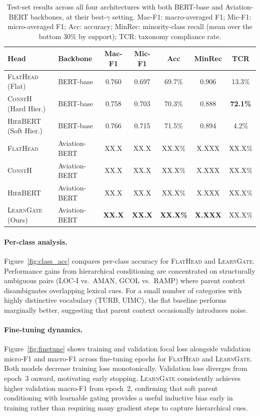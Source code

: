 \documentclass{article}
\newcommand{\modA}{\textsc{FlatHead}}
\newcommand{\modB}{\textsc{ConstH}}
\newcommand{\modC}{\textsc{HierBERT}}
\newcommand{\modD}{\textsc{LearnGate}}
\begin{document}
\begin{table}[h]
\centering
\caption{Test-set results across all four architectures with both
BERT-base and Aviation-BERT backbones, at their best-$\gamma$ setting.
Mac-F1: macro-averaged F1; Mic-F1: micro-averaged F1; Acc: accuracy;
MinRec: minority-class recall (mean over the bottom 30\% by support);
TCR: taxonomy compliance rate.}
\smallskip
\begin{tabular}{llccccc}
\toprule
Head & Backbone & Mac-F1 & Mic-F1 & Acc & MinRec & TCR \\
\midrule
\modA{} (Flat)       & BERT-base       & 0.760 & 0.697 & 69.7\% & 0.906 & 13.3\% \\
\modB{} (Hard Hier.) & BERT-base       & 0.758 & 0.703 & 70.3\% & 0.888 & \textbf{72.1\%} \\
\modC{} (Soft Hier.) & BERT-base       & 0.766 & 0.715 & 71.5\% & 0.894 & 4.2\% \\
\modA{}              & Aviation-BERT   & XX.X  & XX.X  & XX.X\% & X.XXX & XX.X\% \\
\modB{}              & Aviation-BERT   & XX.X  & XX.X  & XX.X\% & X.XXX & XX.X\% \\
\modC{}              & Aviation-BERT   & XX.X  & XX.X  & XX.X\% & X.XXX & XX.X\% \\
\modD{} (Ours)       & Aviation-BERT   & \textbf{XX.X} & \textbf{XX.X} & \textbf{XX.X\%} & \textbf{X.XXX} & XX.X\% \\
\bottomrule
\end{tabular}
\label{tab:results}
\end{table}

\paragraph{Per-class analysis.}
Figure~\ref{fig:class_acc} compares per-class accuracy for \modA{} and
\modD.
Performance gains from hierarchical conditioning are concentrated on
structurally ambiguous pairs (LOC-I vs.~AMAN, GCOL vs.~RAMP) where
parent context disambiguates overlapping lexical cues.
For a small number of categories with highly distinctive vocabulary
(TURB, UIMC), the flat baseline performs marginally better, suggesting
that parent context occasionally introduces noise.

\paragraph{Fine-tuning dynamics.}
Figure~\ref{fig:finetune} shows training and validation focal loss
alongside validation micro-F1 and macro-F1 across fine-tuning epochs
for \modA{} and \modD.
Both models decrease training loss monotonically.
Validation loss diverges from epoch~3 onward, motivating early stopping.
\modD{} consistently achieves higher validation macro-F1 from epoch~2,
confirming that soft parent conditioning with learnable gating
provides a useful inductive bias early in training rather than
requiring many gradient steps to capture hierarchical cues.
\end{document}

